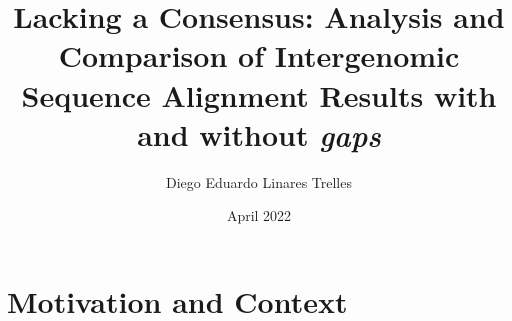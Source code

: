 \documentclass[]{article}
\title{Lacking a Consensus: Analysis and Comparison of Intergenomic Sequence Alignment Results with and without \textit{gaps}}
\author{Diego Eduardo Linares Trelles}
\date{April 2022}
\begin{document}
  \maketitle
  \section{Motivation and Context}
  
  
  
  

  
  \clearpage
  
\end{document}
